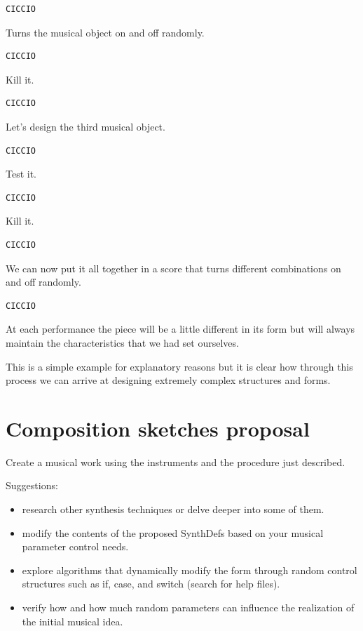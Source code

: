 \begin{lstlisting}[frame=single] 
CICCIO
\end{lstlisting}

Turns the musical object on and off randomly.

\begin{lstlisting}[frame=single] 
CICCIO
\end{lstlisting}

Kill it.

\begin{lstlisting}[frame=single] 
CICCIO
\end{lstlisting}

Let's design the third musical object.

\begin{lstlisting}[frame=single] 
CICCIO
\end{lstlisting}

Test it.

\begin{lstlisting}[frame=single] 
CICCIO
\end{lstlisting}

Kill it.

\begin{lstlisting}[frame=single] 
CICCIO
\end{lstlisting}

We can now put it all together in a score that turns different combinations on and off randomly.

\begin{lstlisting}[frame=single] 
CICCIO
\end{lstlisting}

At each performance the piece will be a little different in its form but will always maintain the characteristics that we had set ourselves.

This is a simple example for explanatory reasons but it is clear how through this process we can arrive at designing extremely complex structures and forms.

\section{Composition sketches proposal}\label{composition-sketches-proposal}

Create a musical work using the instruments and the procedure just described.

Suggestions: 

\begin{itemize}
\tightlist
\item research other synthesis techniques or delve deeper into some of them. 
\item modify the contents of the proposed SynthDefs based on your musical parameter control needs. 
\item explore algorithms that dynamically modify the form through random control structures such as if, case, and switch (search for help files). 
\item verify how and how much random parameters can influence the realization of the initial musical idea.
\end{itemize}